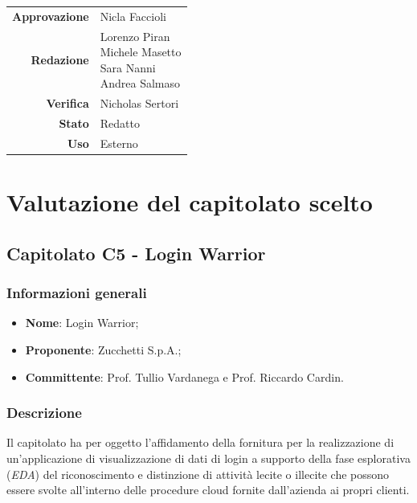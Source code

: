 \documentclass[11pt]{article}
\begin{document}
\begin{titlepage}
\begin{center}
			\vfill
			
			\large
			\begin{tabular}{r|l}
				\textbf{Approvazione} &  Nicla Faccioli\\
				\textbf{Redazione} &  \parbox[t]{3.5cm}{Lorenzo Piran \\ Michele Masetto \\ Sara Nanni \\ Andrea Salmaso}\\
				\textbf{Verifica} &  Nicholas Sertori\\
				\textbf{Stato} & Redatto \\
				\textbf{Uso} & Esterno
			\end{tabular}
			\vfill
			
		\end{center}
	\end{titlepage}

\tableofcontents

\newpage


\section{Valutazione del capitolato scelto}

\subsection{Capitolato C5 - Login Warrior}

    \subsubsection{Informazioni generali}
    \begin{itemize}
        \item \textbf{Nome}: Login Warrior;
        \item \textbf{Proponente}: Zucchetti S.p.A.;
        \item \textbf{Committente}: Prof. Tullio Vardanega e Prof. Riccardo Cardin.
    \end{itemize}
    
    \subsubsection{Descrizione}
    Il capitolato ha per oggetto l'affidamento della fornitura per la realizzazione di un'applicazione di visualizzazione di dati di
    login a supporto della fase esplorativa (\textit{EDA}) del riconoscimento e distinzione di attività lecite o illecite che possono
    essere svolte all'interno delle procedure cloud fornite dall'azienda ai propri clienti.
    
\end{document}

